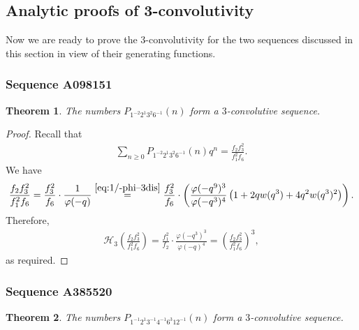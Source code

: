 \documentclass[12pt,reqno]{amsart}
\numberwithin{equation}{section}
\theoremstyle{plain}
\newtheorem{theorem}{Theorem}[section]
\theoremstyle{definition}
\theoremstyle{named}
\newcommand{\HH}{\mathcal{H}}
\begin{document}
\subsection{Analytic proofs of 3-convolutivity}

Now we are ready to prove the $3$-convolutivity for the two sequences discussed in this section in view of their generating functions.

\subsubsection{Sequence A098151}

\begin{theorem}\label{th:A098151}
	The numbers $P_{1^{-2}2^{1}3^{2}6^{-1}}(n)$ form a $3$-convolutive sequence.
\end{theorem}

\begin{proof}
	Recall that
	\begin{align*}
		\sum_{n\ge 0} P_{1^{-2}2^{1}3^{2}6^{-1}}(n) q^n = \frac{f_2 f_3^2}{f_1^2 f_6}.
	\end{align*}
	We have
	\begin{align*}
		\frac{f_2 f_3^2}{f_1^2 f_6} = \frac{f_3^2}{f_6}\cdot \frac{1}{\varphi(-q)} \overset{\eqref{eq:1/-phi--3dis}}{=} \frac{f_3^2}{f_6}\cdot \left(\frac{\varphi(-q^9)^3}{\varphi(-q^3)^4}\left(1+2qw(q^3)+4q^2 w(q^3)^2\right)\right).
	\end{align*}
	Therefore,
	\begin{align*}
		\HH_3\left(\frac{f_2 f_3^2}{f_1^2 f_6}\right) = \frac{f_1^2}{f_2}\cdot \frac{\varphi(-q^3)^3}{\varphi(-q)^4} = \left(\frac{f_2 f_3^2}{f_1^2 f_6}\right)^3,
	\end{align*}
	as required.
\end{proof}

\subsubsection{Sequence A385520}

\begin{theorem}\label{th:A293306}
	The numbers $P_{1^{-1} 2^1 3^{-1} 4^{-1} 6^3 12^{-1}}(n)$ form a $3$-convolutive sequence.
\end{theorem}
\end{document}
